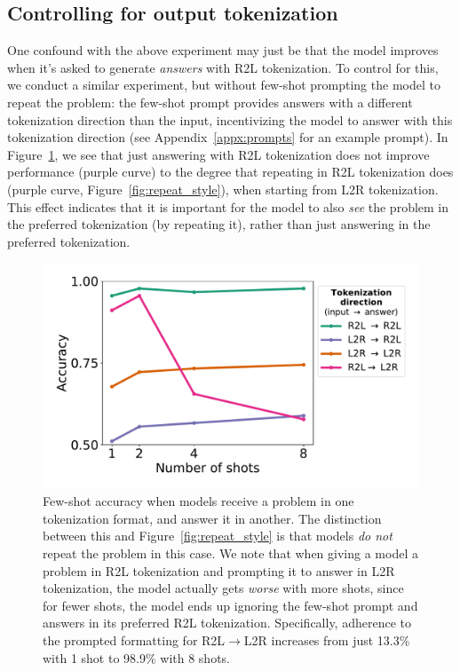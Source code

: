 \documentclass{article}
\theoremstyle{plain}
\theoremstyle{definition}
\theoremstyle{remark}
\begin{document}
\subsection{Controlling for output tokenization}
\label{sec:repeat_output_control}

One confound with the above experiment may just be that the model improves when it's asked to generate \textit{answers} with R2L tokenization. To control for this, we conduct a similar experiment, but without few-shot prompting the model to repeat the problem: the few-shot prompt provides answers with a different tokenization direction than the input, incentivizing the model to answer with this tokenization direction (see Appendix~\ref{appx:prompts} for an example prompt). In Figure~\ref{fig:answer_style}, we see that just answering with R2L tokenization does not improve performance (purple curve) to the degree that repeating in R2L tokenization does (purple curve, Figure~\ref{fig:repeat_style}), when starting from L2R tokenization. This effect indicates that it is important for the model to also \textit{see} the problem in the preferred tokenization (by repeating it), rather than just answering in the preferred tokenization. 

\begin{figure}[ht]
    \centering
    \includegraphics[width=\columnwidth]{figures/answer_style.pdf}
    \vspace{-3em}
    \caption{Few-shot accuracy when models receive a problem in one tokenization format, and answer it in another. The distinction between this and Figure~\ref{fig:repeat_style} is that models \textit{do not} repeat the problem in this case. We note that when giving a model a problem in R2L tokenization and prompting it to answer in L2R tokenization, the model actually gets \textit{worse} with more shots, since for fewer shots, the model ends up ignoring the few-shot prompt and answers in its preferred R2L tokenization. Specifically, adherence to the prompted formatting for R2L$\rightarrow$L2R increases from just 13.3\% with 1 shot to 98.9\% with 8 shots.}
    \label{fig:answer_style}
\end{figure}
\end{document}
